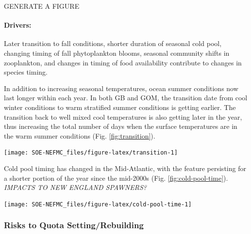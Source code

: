 \documentclass[
  10pt,
]{article}
\let\origfigure\figure
\let\endorigfigure\endfigure
\renewenvironment{figure}[1][2] {
    \expandafter\origfigure\expandafter[H]
} {
    \endorigfigure
}
\begin{document}
GENERATE A FIGURE

\hypertarget{drivers-1}{%
\paragraph{Drivers:}\label{drivers-1}}

Later transition to fall conditions, shorter duration of seasonal cold pool, changing timing of fall phytoplankton blooms, seasonal community shifts in zooplankton, and changes in timing of food availability contribute to changes in species timing.

In addition to increasing seasonal temperatures, ocean summer conditions now last longer within each year. In both GB and GOM, the transition date from cool winter conditions to warm stratified summer conditions is getting earlier. The transition back to well mixed cool temperatures is also getting later in the year, thus increasing the total number of days when the surface temperatures are in the warm summer conditions (Fig. \ref{fig:transition}).

\begin{figure}

{\centering \texttt{[image: SOE-NEFMC\_files/figure-latex/transition-1]} 

}

\caption{Ocean summer length in the MAB: the annual total number of days between the spring thermal transition date and the fall thermal transition date.  The transition dates are defined as the day of the year when surface temperatures changeover from cool to warm conditions in the spring and back to cool conditions in the fall.}\label{fig:transition}
\end{figure}

Cold pool timing has changed in the Mid-Atlantic, with the feature persisting for a shorter portion of the year since the mid-2000s (Fig. \ref{fig:cold-pool-time}). \emph{IMPACTS TO NEW ENGLAND SPAWNERS?}

\begin{figure}

{\centering \texttt{[image: SOE-NEFMC\_files/figure-latex/cold-pool-time-1]} 

}

\caption{Seasonal cold pool indices: mean temperature within the cold pool, cold pool persistence, and spatial extent.}\label{fig:cold-pool-time}
\end{figure}

\hypertarget{risks-to-quota-settingrebuilding}{%
\subsubsection{Risks to Quota Setting/Rebuilding}\label{risks-to-quota-settingrebuilding}}
\end{document}
